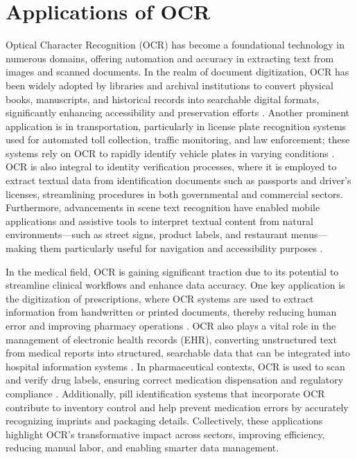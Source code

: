 \begin{table}[tb!]
{\begin{tabular}{|p{3.2cm}|p{4.5cm}|p{4.8cm}|p{4.8cm}|p{4.8cm}|}
\hline
\end{tabular}}

\label{tab:ocr_generations}
\end{table}



\section{Applications of OCR}
Optical Character Recognition (OCR) has become a foundational technology in numerous domains, offering automation and accuracy in extracting text from images and scanned documents. In the realm of document digitization, OCR has been widely adopted by libraries and archival institutions to convert physical books, manuscripts, and historical records into searchable digital formats, significantly enhancing accessibility and preservation efforts \cite{Gupta2016}. Another prominent application is in transportation, particularly in license plate recognition systems used for automated toll collection, traffic monitoring, and law enforcement; these systems rely on OCR to rapidly identify vehicle plates in varying conditions \cite{Shi2016}. OCR is also integral to identity verification processes, where it is employed to extract textual data from identification documents such as passports and driver’s licenses, streamlining procedures in both governmental and commercial sectors. Furthermore, advancements in scene text recognition have enabled mobile applications and assistive tools to interpret textual content from natural environments—such as street signs, product labels, and restaurant menus—making them particularly useful for navigation and accessibility purposes \cite{baek2019character}.

In the medical field, OCR is gaining significant traction due to its potential to streamline clinical workflows and enhance data accuracy. One key application is the digitization of prescriptions, where OCR systems are used to extract information from handwritten or printed documents, thereby reducing human error and improving pharmacy operations \cite{Liu2020}. OCR also plays a vital role in the management of electronic health records (EHR), converting unstructured text from medical reports into structured, searchable data that can be integrated into hospital information systems \cite{Goodrum2020}. In pharmaceutical contexts, OCR is used to scan and verify drug labels, ensuring correct medication dispensation and regulatory compliance \cite{Datta2025}. Additionally, pill identification systems that incorporate OCR contribute to inventory control and help prevent medication errors by accurately recognizing imprints and packaging details. Collectively, these applications highlight OCR’s transformative impact across sectors, improving efficiency, reducing manual labor, and enabling smarter data management.


